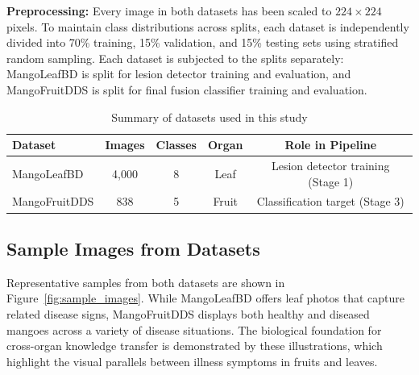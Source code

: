 \documentclass[utf8]{FrontiersinHarvard} %
\begin{document}
\textbf{Preprocessing:} Every image in both datasets has been scaled to $224 \times 224$ pixels. To maintain class distributions across splits, each dataset is independently divided into 70\% training, 15\% validation, and 15\% testing sets using stratified random sampling. Each dataset is subjected to the splits separately: MangoLeafBD is split for lesion detector training and evaluation, and MangoFruitDDS is split for final fusion classifier training and evaluation.

\begin{table}[!ht]
    \centering
    \caption{Summary of datasets used in this study}
    \label{tab:datasets}
    \footnotesize
    \begin{tabular}{lcccc}
        \toprule
        \textbf{Dataset} & \textbf{Images} & \textbf{Classes} & \textbf{Organ} & \textbf{Role in Pipeline} \\
        \midrule
        MangoLeafBD & 4,000 & 8 & Leaf & Lesion detector training (Stage 1) \\
        MangoFruitDDS & 838 & 5 & Fruit & Classification target (Stage 3) \\
        \bottomrule
    \end{tabular}
\end{table}

\subsection{Sample Images from Datasets}
Representative samples from both datasets are shown in Figure~\ref{fig:sample_images}. While MangoLeafBD offers leaf photos that capture related disease signs, MangoFruitDDS displays both healthy and diseased mangoes across a variety of disease situations. The biological foundation for cross-organ knowledge transfer is demonstrated by these illustrations, which highlight the visual parallels between illness symptoms in fruits and leaves.
\end{document}
